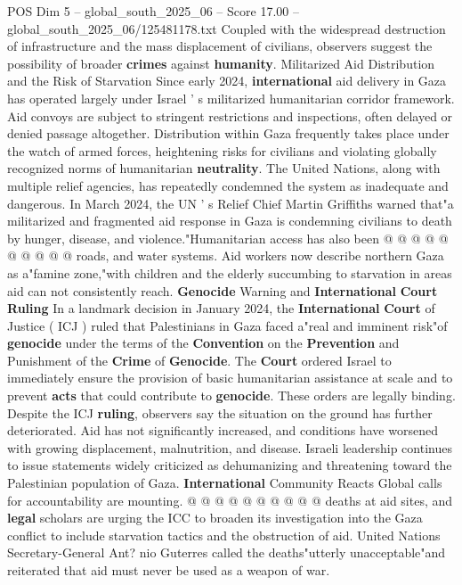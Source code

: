 \begin{textsample}{POS Dim 5 – global\_south\_2025\_06 – Score 17.00 – global\_south\_2025\_06/125481178.txt}
Coupled with the widespread destruction of infrastructure and the mass displacement of civilians, observers suggest the possibility of broader \textbf{crimes} against \textbf{humanity}.
Militarized Aid Distribution and the Risk of Starvation Since early 2024, \textbf{international} aid delivery in Gaza has operated largely under Israel ' s militarized humanitarian corridor framework.
Aid convoys are subject to stringent restrictions and inspections, often delayed or denied passage altogether.
Distribution within Gaza frequently takes place under the watch of armed forces, heightening risks for civilians and violating globally recognized norms of humanitarian \textbf{neutrality}.
The United Nations, along with multiple relief agencies, has repeatedly condemned the system as inadequate and dangerous.
In March 2024, the UN ' s Relief Chief Martin Griffiths warned that"a militarized and fragmented aid response in Gaza is condemning civilians to death by hunger, disease, and violence."Humanitarian access has also been @ @ @ @ @ @ @ @ @ @ roads, and water systems.
Aid workers now describe northern Gaza as a"famine zone,"with children and the elderly succumbing to starvation in areas aid can not consistently reach. \textbf{Genocide} Warning and \textbf{International} \textbf{Court} \textbf{Ruling} In a landmark decision in January 2024, the \textbf{International} \textbf{Court} of Justice ( ICJ ) ruled that Palestinians in Gaza faced a"real and imminent risk"of \textbf{genocide} under the terms of the \textbf{Convention} on the \textbf{Prevention} and Punishment of the \textbf{Crime} of \textbf{Genocide}.
The \textbf{Court} ordered Israel to immediately ensure the provision of basic humanitarian assistance at scale and to prevent \textbf{acts} that could contribute to \textbf{genocide}.
These orders are legally binding.
Despite the ICJ \textbf{ruling}, observers say the situation on the ground has further deteriorated.
Aid has not significantly increased, and conditions have worsened with growing displacement, malnutrition, and disease.
Israeli leadership continues to issue statements widely criticized as dehumanizing and threatening toward the Palestinian population of Gaza. \textbf{International} Community Reacts Global calls for accountability are mounting. @ @ @ @ @ @ @ @ @ @ deaths at aid sites, and \textbf{legal} scholars are urging the ICC to broaden its investigation into the Gaza conflict to include starvation tactics and the obstruction of aid.
United Nations Secretary-General Ant? nio Guterres called the deaths"utterly unacceptable"and reiterated that aid must never be used as a weapon of war.

\end{textsample}
